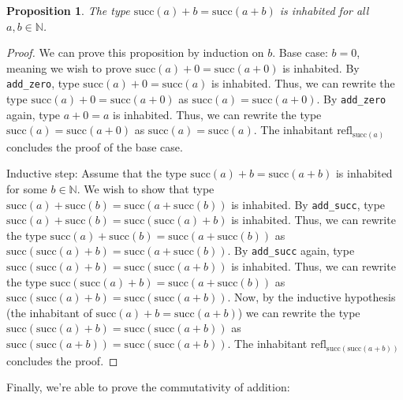 \documentclass[12pt]{article}
\newtheorem{proposition}{Proposition}[section]
\theoremstyle{definition}
\theoremstyle{remark}
\begin{document}
\begin{proposition}
  The type $\text{succ}(a) + b = \text{succ}(a+b)$ is inhabited for all $a, b \in \mathbb{N}$.
\end{proposition}
\begin{proof}
  We can prove this proposition by induction on $b$. Base case: $b = 0$, meaning we wish to prove $\text{succ} (a) + 0 = \text{succ} (a+0)$ is inhabited. By \texttt{add\_zero}, type $\text{succ}(a) + 0 = \text{succ}(a)$ is inhabited. Thus, we can rewrite the type $\text{succ} (a) + 0 = \text{succ} (a+0)$ as $\text{succ}(a) = \text{succ}(a+0)$. By \texttt{add\_zero} again, type $a+0=a$ is inhabited. Thus, we can rewrite the type $\text{succ}(a) = \text{succ}(a+0)$ as $\text{succ}(a) = \text{succ}(a)$. The inhabitant $\text{refl}_{\text{succ}(a)}$ concludes the proof of the base case.
  
  Inductive step: Assume that the type $\text{succ}(a) + b = \text{succ}(a+b)$ is inhabited for some $b \in \mathbb{N}$. We wish to show that type $\text{succ}(a) + \text{succ}(b) = \text{succ}(a+\text{succ}(b))$ is inhabited. By \texttt{add\_succ}, type $\text{succ}(a) + \text{succ}(b) = \text{succ}(\text{succ}(a) + b)$ is inhabited. Thus, we can rewrite the type $\text{succ}(a) + \text{succ}(b) = \text{succ}(a+\text{succ}(b))$ as $\text{succ}(\text{succ}(a) + b) = \text{succ}(a+\text{succ}(b))$. By \texttt{add\_succ} again, type $\text{succ}(\text{succ}(a)+b) = \text{succ}(\text{succ}(a+b))$ is inhabited. Thus, we can rewrite the type $\text{succ}(\text{succ}(a) + b) = \text{succ}(a+\text{succ}(b))$ as $\text{succ}(\text{succ}(a)+b) = \text{succ}(\text{succ}(a+b))$. Now, by the inductive hypothesis (the inhabitant of $\text{succ}(a) + b = \text{succ}(a+b)$) we can rewrite the type $\text{succ}(\text{succ}(a) + b) = \text{succ}(\text{succ}(a+b))$ as $\text{succ}(\text{succ}(a+b)) = \text{succ}(\text{succ}(a+b))$.
  The inhabitant $\text{refl}_{\text{succ}(\text{succ}(a+b))}$ concludes the proof.
\end{proof}

Finally, we're able to prove the commutativity of addition:
\end{document}
